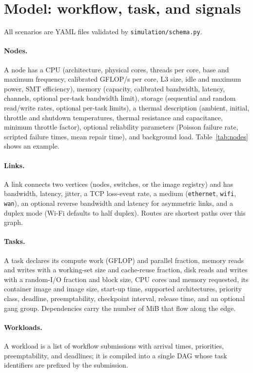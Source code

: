 \documentclass[12pt,a4paper]{report}
\begin{document}
\section{Model: workflow, task, and signals}

All scenarios are YAML files validated by \texttt{simulation/schema.py}.

\paragraph{Nodes.} A node has a CPU (architecture, physical cores, threads
per core, base and maximum frequency, calibrated GFLOP/s per core, L3 size,
idle and maximum power, SMT efficiency), memory (capacity, calibrated
bandwidth, latency, channels, optional per-task bandwidth limit), storage
(sequential and random read/write rates, optional per-task limits), a
thermal description (ambient, initial, throttle and shutdown temperatures,
thermal resistance and capacitance, minimum throttle factor), optional
reliability parameters (Poisson failure rate, scripted failure times, mean
repair time), and background load. Table~\ref{tab:nodes} shows an example.

\paragraph{Links.} A link connects two vertices (nodes, switches, or the
image registry) and has bandwidth, latency, jitter, a TCP loss-event rate,
a medium (\texttt{ethernet}, \texttt{wifi}, \texttt{wan}), an optional
reverse bandwidth and latency for asymmetric links, and a duplex mode
(Wi-Fi defaults to half duplex). Routes are shortest paths over this graph.

\paragraph{Tasks.} A task declares its compute work (GFLOP) and parallel
fraction, memory reads and writes with a working-set size and cache-reuse
fraction, disk reads and writes with a random-I/O fraction and block size,
CPU cores and memory requested, its container image and image size,
start-up time, supported architectures, priority class, deadline,
preemptability, checkpoint interval, release time, and an optional gang
group. Dependencies carry the number of MiB that flow along the edge.

\paragraph{Workloads.} A workload is a list of workflow submissions with
arrival times, priorities, preemptability, and deadlines; it is compiled
into a single DAG whose task identifiers are prefixed by the submission.
\end{document}
